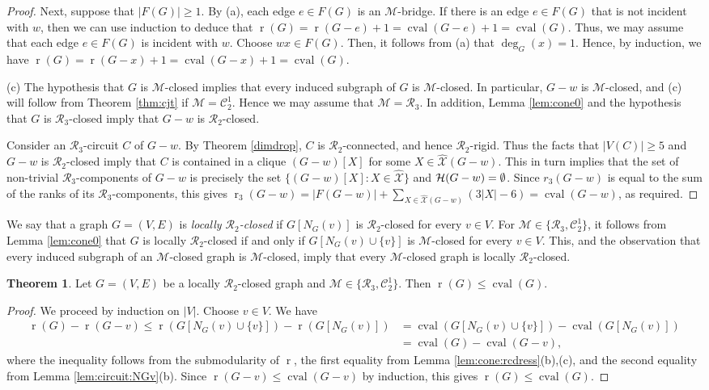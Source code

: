 \documentclass[11pt,a4paper]{article}
\theoremstyle{definition}
\newtheorem{theorem}{Theorem}[section]
\DeclareMathOperator{\rr}{r}
\DeclareMathOperator{\cval}{cval}
\newcommand{\cR}{\mathcal{R}}
\newcommand{\cM}{\mathcal{M}}
\newcommand{\hXX}{\hat{\mathcal{X}}}
\newcommand{\cC}{\mathcal{C}}
\begin{document}
\begin{proof}
Next, suppose that $|F(G)|\geq 1$. By (a),
each edge $e\in F(G)$ is an $\cM$-bridge.
If there is an edge $e\in F(G)$ that is not incident with $w$, then we can use induction to deduce that $\rr(G)=\rr(G-e)+1=\cval(G-e)+1=\cval(G)$.
Thus, we may assume that each edge $e\in F(G)$ is incident with $w$. Choose $wx\in F(G)$. Then, it follows from (a) 
that $\deg_G(x)=1$. Hence, by induction, we have $\rr(G)=\rr(G-x)+1=\cval(G-x)+1=\cval(G)$.\medskip

(c) The hypothesis that $G$ is $\cM$-closed implies that every induced subgraph of $G$ is $\cM$-closed. In particular, $G-w$ is $\cM$-closed, and (c) will follow from  Theorem \ref{thm:cjt} if $\cM=\cC_2^1$.   Hence we may assume that $\cM=\cR_3$.
In addition, Lemma \ref{lem:cone0}
and the hypothesis that $G$ is $\cR_3$-closed imply that $G-w$ is $\cR_2$-closed.

Consider an $\cR_3$-circuit $C$ of $G-w$. 
By Theorem \ref{dimdrop},
$C$ is $\cR_2$-connected, and hence $\cR_2$-rigid.
Thus the facts that $|V(C)|\geq 5$ and $G-w$ is $\cR_2$-closed imply that
$C$ is contained in a clique $(G-w)[X]$ for some $X\in \hXX(G-w)$.
This in turn implies that the set of non-trivial $\cR_3$-components of $G-w$ is precisely the set $\{(G-w)[X]:X\in \hXX\}$ and ${\cal H}(G-w)=\emptyset$. Since $r_3(G-w)$ is equal to the sum of the ranks of its $\cR_3$-components, this gives $\rr_3(G-w)=|F(G-w)|+\sum_{X\in \hXX(G-w)}(3|X|-6)=\cval(G-w)$, as required.
\end{proof}


We say that a graph  $G=(V,E)$ is {\it locally $\cR_2$-closed} if $G[N_G(v)]$ is $\cR_2$-closed for every $v\in V$. For $\cM\in \{\cR_3,\cC_2^1\}$, it follows from Lemma \ref{lem:cone0} that $G$ is locally $\cR_2$-closed if and only if $G[N_G(v)\cup \{v\}]$ is $\cM$-closed for every $v\in V$. This, and the observation that every induced subgraph of an $\cM$-closed graph is $\cM$-closed, imply that every $\cM$-closed graph is locally $\cR_2$-closed.
\begin{theorem}\label{thm:rcdress:ineq}
Let  $G=(V,E)$ be a locally $\cR_2$-closed graph and $\cM\in \{\cR_3,\cC_2^1\}$.  Then   $\rr(G)\leq \cval(G).$
\end{theorem}			
\begin{proof} We proceed by  induction on $|V|$.  Choose $v\in V$. We have
\begin{align*}
\rr(G) - \rr(G-v) \leq \rr(G[N_G(v)\cup \{v\}]) - \rr(G[N_G(v)]) &= \cval(G[N_G(v)\cup \{v\}]) - \cval(G[N_G(v)])\\ 
&= \cval(G) - \cval(G-v),
\end{align*}
where the inequality follows from the submodularity of $\rr$, the first equality from Lemma \ref{lem:cone:rcdress}(b),(c), and the second equality from Lemma \ref{lem:circuit:NGv}(b). Since $\rr(G-v)\leq \cval(G-v)$ by induction, this gives $\rr(G)\leq \cval(G)$.
\end{proof}
\end{document}
